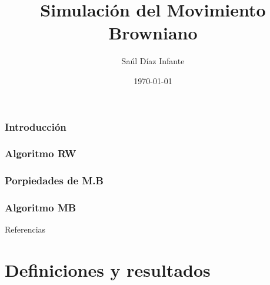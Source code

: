 \documentclass[spanish,10pt,xcolor=dvipsnames,table]{beamer}
\title{Simulaci\'on del Movimiento Browniano}
\author{
        Sa\'ul D\'iaz Infante
}
\institute{CIMAT A.C.}
\date{\today}
\theoremstyle{plain} %
\theoremstyle{definition}
\begin{document}
  \frame{\titlepage \vspace{-0.5cm}} 
	\section{Introducci\'{o}n}
		
	\section{Algoritmo RW} 
	  	   	
  	\section{Porpiedades de M.B}
			
	 \section{Algoritmo MB}
		  
	\begin{frame}[allowframebreaks]{Referencias}	
		\nocite{*}		
		
		
  \end{frame}
  \appendix
	\part{Definiciones y resultados}
	
\end{document}
